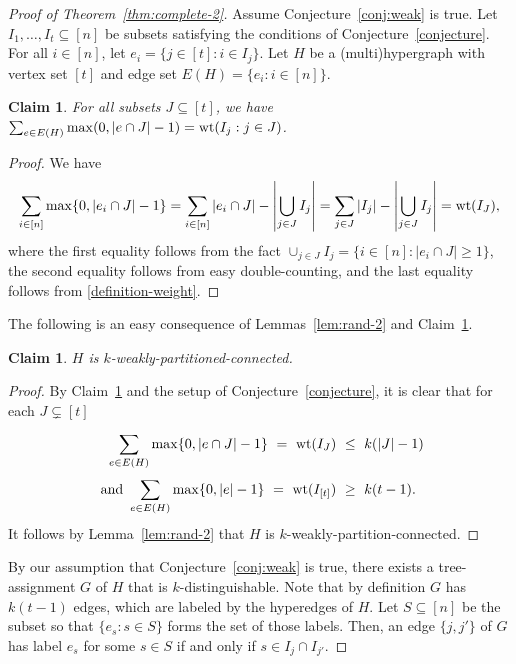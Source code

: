 \documentclass[11pt]{article}
\newtheorem{claim}[theorem]{Claim}
\newcommand{\wt}{{\rm wt}}
\newcommand{\abs}[1]{\left\vert#1\right\vert}
\begin{document}
\begin{proof}[Proof of Theorem~\ref{thm:complete-2}]
Assume Conjecture~\ref{conj:weak} is true.
Let $I_1,\dots,I_t\subseteq[n]$ be subsets satisfying the conditions of Conjecture~\ref{conjecture}.
For all $i\in [n]$, let $e_i=\{j\in [t]: i\in I_j\}$.
Let $H$ be a (multi)hypergraph with vertex set $[t]$ and edge set $E(H)=\{e_i:i\in[n]\}$.

\begin{claim}\label{lem:new-1}
For all subsets $J\subseteq[t]$, we have $\sum_{e\in E(H)}^{} \max(0,|e\cap J|-1)=\wt(I_j:j\in J)$.
\end{claim}

\begin{proof}
  We have
  \begin{equation*}
      \begin{aligned}
          \sum_{i\in [n]} \max\{0,|e_i\cap J|-1\}=\sum_{i\in [n]} |e_i\cap J|-\abs{\bigcup_{j\in J} I_j}=\sum_{j\in J} |I_j|-\abs{\bigcup_{j\in J} I_j}=\wt(I_J),
      \end{aligned}
  \end{equation*}
  where the first equality follows from the fact $\cup_{j\in J} I_j=\{i\in [n]: |e_i\cap J|\ge 1\}$, the second equality follows from easy double-counting, and the last equality follows from \eqref{definition-weight}.
\end{proof}

The following is an easy consequence of Lemmas~\ref{lem:rand-2} and Claim~\ref{lem:new-1}.

\begin{claim}\label{lem:new-2}
  $H$ is $k$-weakly-partitioned-connected.
\end{claim}
\begin{proof}
  By Claim~\ref{lem:new-1} and the setup of Conjecture~\ref{conjecture}, it is clear that for each $J\subsetneq [t]$
\begin{align}
  \sum_{e\in E(H)}^{} \max\{0,|e\cap J|-1\}  \ = \  \wt(I_J) \  &\le \   k(|J|-1) \nonumber\\
  \text{~and~} \sum_{e\in E(H)}^{} \max\{0,|e|-1\} \ = \ \wt(I_{[t]}) \ &\ge \   k(t-1).
\end{align}
It follows by Lemma~\ref{lem:rand-2} that $H$ is $k$-weakly-partition-connected.
\end{proof}



By our assumption that Conjecture~\ref{conj:weak} is true, there exists a tree-assignment $G$ of $H$ that is $k$-distinguishable. Note that by definition $G$ has $k(t-1)$ edges, which are labeled by the hyperedges of $H$. Let $S\subseteq [n]$ be the subset so that $\{e_s:s\in S\}$ forms the set of those labels. Then, an edge $\{j,j'\}$ of $G$ has label $e_s$ for some $s\in S$ if and only if $s\in I_j\cap I_{j'}$.


\end{proof}
\end{document}
